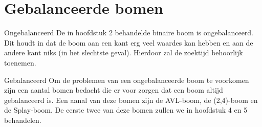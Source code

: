 \chapter{Gebalanceerde bomen}
\label{sec:Hoofdstuk 3}

Ongebalanceerd
De in hoofdstuk 2 behandelde binaire boom is ongebalanceerd. Dit houdt in dat de boom aan een kant erg veel waardes kan hebben en aan de andere kant niks (in het slechtste geval). Hierdoor zal de zoektijd behoorlijk toenemen.

Gebalanceerd
Om de problemen van een ongebalanceerde boom te voorkomen zijn een aantal bomen bedacht die er voor zorgen dat een boom altijd gebalanceerd is. Een aanal van deze bomen zijn de AVL-boom, de (2,4)-boom en de Splay-boom. De eerste twee van deze bomen zullen we in hoofdstuk 4 en 5 behandelen.

